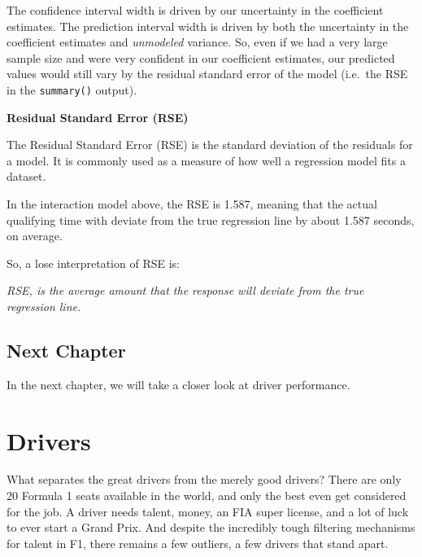 \documentclass[
]{book}
\begin{document}
The confidence interval width is driven by our uncertainty in the coefficient estimates. The prediction interval width is driven by both the uncertainty in the coefficient estimates and \emph{unmodeled} variance. So, even if we had a very large sample size and were very confident in our coefficient estimates, our predicted values would still vary by the residual standard error of the model (i.e.~the RSE in the \texttt{summary()} output).

\begin{blackbox}

\begin{center}
\textbf{Residual Standard Error (RSE)}

\end{center}

The Residual Standard Error (RSE) is the standard deviation of the residuals for a model. It is commonly used as a measure of how well a regression model fits a dataset.

In the interaction model above, the RSE is 1.587, meaning that the actual qualifying time with deviate from the true regression line by about 1.587 seconds, on average.

So, a lose interpretation of RSE is:

\emph{RSE, is the average amount that the response will deviate from the true regression line.}

\end{blackbox}

\hypertarget{next-chapter-2}{%
\section{Next Chapter}\label{next-chapter-2}}

In the next chapter, we will take a closer look at driver performance.

\hypertarget{drivers}{%
\chapter{Drivers}\label{drivers}}

What separates the great drivers from the merely good drivers? There are only 20 Formula 1 seats available in the world, and only the best even get considered for the job. A driver needs talent, money, an FIA super license, and a lot of luck to ever start a Grand Prix. And despite the incredibly tough filtering mechanisms for talent in F1, there remains a few outliers, a few drivers that stand apart.
\end{document}
